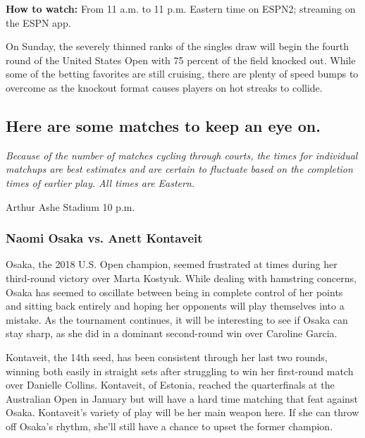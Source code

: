 \textbf{How to watch:} From 11 a.m. to 11 p.m. Eastern time on ESPN2;
streaming on the ESPN app.

On Sunday, the severely thinned ranks of the singles draw will begin the
fourth round of the United States Open with 75 percent of the field
knocked out. While some of the betting favorites are still cruising,
there are plenty of speed bumps to overcome as the knockout format
causes players on hot streaks to collide.

\hypertarget{here-are-some-matches-to-keep-an-eye-on}{%
\subsection{Here are some matches to keep an eye
on.}\label{here-are-some-matches-to-keep-an-eye-on}}

\emph{Because of the number of matches cycling through courts, the times
for individual matchups are best estimates and are certain to fluctuate
based on the completion times of earlier play. All times are Eastern.}

Arthur Ashe Stadium \textbar{} 10 p.m.

\hypertarget{naomi-osaka-vs-anett-kontaveit}{%
\subsubsection{\texorpdfstring{\textbf{Naomi Osaka vs. Anett
Kontaveit}}{Naomi Osaka vs. Anett Kontaveit}}\label{naomi-osaka-vs-anett-kontaveit}}

Osaka, the 2018 U.S. Open champion, seemed frustrated at times during
her third-round victory over Marta Kostyuk. While dealing with hamstring
concerns, Osaka has seemed to oscillate between being in complete
control of her points and sitting back entirely and hoping her opponents
will play themselves into a mistake. As the tournament continues, it
will be interesting to see if Osaka can stay sharp, as she did in a
dominant second-round win over Caroline Garcia.

Kontaveit, the 14th seed, has been consistent through her last two
rounds, winning both easily in straight sets after struggling to win her
first-round match over Danielle Collins. Kontaveit, of Estonia, reached
the quarterfinals at the Australian Open in January but will have a hard
time matching that feat against Osaka. Kontaveit's variety of play will
be her main weapon here. If she can throw off Osaka's rhythm, she'll
still have a chance to upset the former champion.

